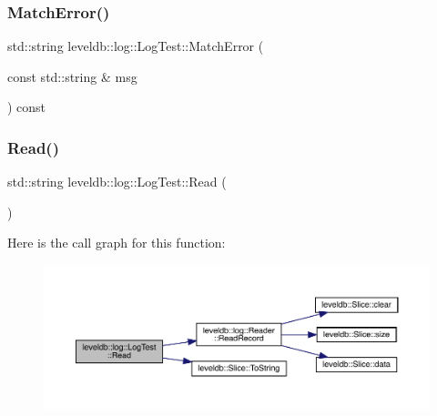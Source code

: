 \subsubsection{\texorpdfstring{MatchError()}{MatchError()}}
{\footnotesize\ttfamily std\+::string leveldb\+::log\+::\+Log\+Test\+::\+Match\+Error (\begin{DoxyParamCaption}\item[{const std\+::string \&}]{msg }\end{DoxyParamCaption}) const\hspace{0.3cm}{\ttfamily [inline]}}

\mbox{\label{classleveldb_1_1log_1_1_log_test_a2f5deb8b04200600ac0bc7cd3e39bd57}} 
\subsubsection{\texorpdfstring{Read()}{Read()}}
{\footnotesize\ttfamily std\+::string leveldb\+::log\+::\+Log\+Test\+::\+Read (\begin{DoxyParamCaption}{ }\end{DoxyParamCaption})\hspace{0.3cm}{\ttfamily [inline]}}

Here is the call graph for this function\+:
\nopagebreak
\begin{figure}[H]
\begin{center}
\leavevmode
\includegraphics[width=350pt]{classleveldb_1_1log_1_1_log_test_a2f5deb8b04200600ac0bc7cd3e39bd57_cgraph}
\end{center}
\end{figure}
\mbox{\label{classleveldb_1_1log_1_1_log_test_a0e83e390485711589ee405d85c9f376f}} 
